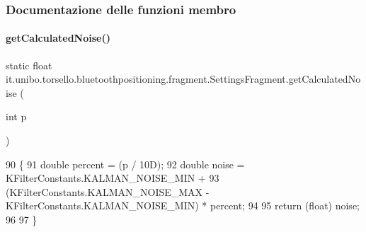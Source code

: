 \subsubsection{Documentazione delle funzioni membro}
\hypertarget{classit_1_1unibo_1_1torsello_1_1bluetoothpositioning_1_1fragment_1_1SettingsFragment_a595d859602f34ca81957a0578c1602a6_a595d859602f34ca81957a0578c1602a6}{}\label{classit_1_1unibo_1_1torsello_1_1bluetoothpositioning_1_1fragment_1_1SettingsFragment_a595d859602f34ca81957a0578c1602a6_a595d859602f34ca81957a0578c1602a6} 
\paragraph{\texorpdfstring{get\+Calculated\+Noise()}{getCalculatedNoise()}}
{\footnotesize\ttfamily static float it.\+unibo.\+torsello.\+bluetoothpositioning.\+fragment.\+Settings\+Fragment.\+get\+Calculated\+Noise (\begin{DoxyParamCaption}\item[{int}]{p }\end{DoxyParamCaption})\hspace{0.3cm}{\ttfamily [static]}}


\begin{DoxyCode}
90                                                   \{
91         \textcolor{keywordtype}{double} percent = (p / 10D);
92         \textcolor{keywordtype}{double} noise = KFilterConstants.KALMAN\_NOISE\_MIN +
93                 (KFilterConstants.KALMAN\_NOISE\_MAX - KFilterConstants.KALMAN\_NOISE\_MIN) * percent;
94 
95         \textcolor{keywordflow}{return} (\textcolor{keywordtype}{float}) noise;
96 
97     \}
\end{DoxyCode}
\hypertarget{classit_1_1unibo_1_1torsello_1_1bluetoothpositioning_1_1fragment_1_1SettingsFragment_a4eb69c78cde2ba119eb62453688280f5_a4eb69c78cde2ba119eb62453688280f5}{}\label{classit_1_1unibo_1_1torsello_1_1bluetoothpositioning_1_1fragment_1_1SettingsFragment_a4eb69c78cde2ba119eb62453688280f5_a4eb69c78cde2ba119eb62453688280f5} 
